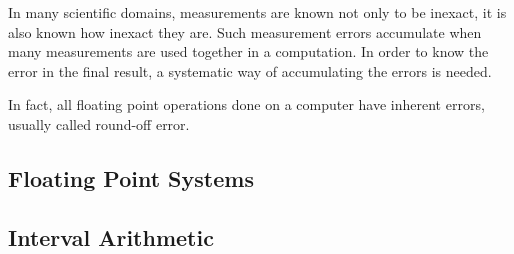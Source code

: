 \documentclass[scalable-gopt.tex]{subfiles}
\begin{document}
  In many scientific domains, measurements are known not only to be inexact, it is also known how inexact they are.
  Such measurement errors accumulate when many measurements are used together in a computation.
  In order to know the error in the final result, a systematic way of accumulating the errors is needed.

  In fact, all floating point operations done on a computer have inherent errors, usually called round-off error.

  \subsection{Floating Point Systems}
    

  \subsection{Interval Arithmetic}
    
  
\end{document}
